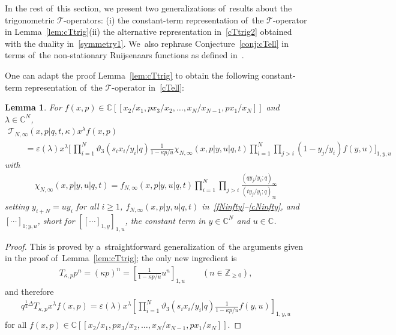 \documentclass[pdftex]{sigma}%
\numberwithin{equation}{section}
\newtheorem{Lemma}[Theorem]{Lemma}
\newcommand{\C}{{\mathbb C}}
\newcommand{\Z}{{\mathbb Z}}
\newcommand{\cT}{{\mathcal T}}
\begin{document}
In the rest of~this section, we present two generalizations of~results about the trigonometric $\cT$-operators: (i) the constant-term representation of~the $\cT$-operator in Lemma~\ref{lem:cTtrig}(ii) the alternative representation in~\eqref{cTtrig2} obtained with the duality in~\eqref{symmetry1}. We~also rephrase Conjecture~\ref{conj:cTell} in terms of~the non-stationary Ruijsenaars functions as defined in~\cite{S}.

One can adapt the proof Lemma~\ref{lem:cTtrig} to obtain the following constant-term representation of~the $\cT$-operator in~\eqref{cTell}:
\begin{Lemma}
For $f(x,p)\in \C[[x_2/x_1,px_3/x_2,\dots,x_{N}/x_{N-1},px_1/x_N]]$ and $\lambda\in\C^N$,
\begin{gather*}
\cT_{N,\infty}(x,p|q,t,\kappa)x^\lambda f(x,p)
\\ \qquad
{}= \varepsilon(\lambda)x^\lambda\Biggl[\,\prod_{i=1}^N\vartheta_3(s_ix_i/y_i|q)
\frac1{1-\kappa p/u}\chi_{N,\infty}(x,p|y,u|q,t)
 \prod_{i=1}^N\prod_{j >i} (1-y_j/y_i)f(y,u) \Biggr]_{1,y,u}
\end{gather*}
with
\begin{gather*}
\chi_{N,\infty}(x,p|y,u|q,t) = f_{N,\infty}(x,p|y,u|q,t) \prod_{i=1}^N \prod_{j>i} \frac{(qy_j/y_i;q)_\infty}{(ty_j/y_i;q)_\infty}
\end{gather*}
setting $y_{i+N}=u y_i$ for all $i\geq 1$, $f_{N,\infty}(x,p|y,u|q,t)$ in~\eqref{fNinfty}--\eqref{cNinfty}, and $[\cdots]_{1;y,u}$, short
for $[[\cdots]_{1,y}]_{1,u}$, the constant term in $y\in\C^N$ and $u\in\C$.
\end{Lemma}

\begin{proof}
This is proved by a~straightforward generalization of~the arguments given in the proof of~Lemma~\ref{lem:cTtrig}; the only new ingredient is
\begin{gather*}
T_{\kappa,p} p^n = (\kappa p)^n = \left[\frac1{1-\kappa p/u}u^n\right]_{1,u}\qquad (n\in\Z_{\geq 0}),
\end{gather*}
and therefore
\begin{gather*}
q^{\frac12\Delta}T_{\kappa,p} x^\lambda f(x,p) = \varepsilon(\lambda)x^\lambda \left[ \prod_{i=1}^N\vartheta_3(s_ix_i/y_i|q) \frac1{1-\kappa p/u} f(y,u) \right]_{1,y,u}
\end{gather*}
for all $f(x,p)\in \C[[x_2/x_1,px_3/x_2,\dots,x_{N}/x_{N-1},px_1/x_N]]$.
\end{proof}
\end{document}
